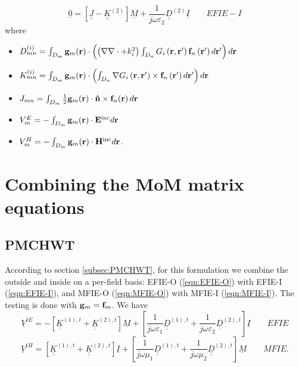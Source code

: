 \begin{equation}\label{eqn:Matrix EFIE-I}
\boxed{\underline{0} =  \left[\underline{\underline{J}} - \underline{\underline{K}}^{(2)} \right] \underline{M} + \frac{1}{j \omega \varepsilon_2}  \underline{\underline{D}}^{(2)} \underline{I} } \qquad EFIE-I 
\end{equation}
where
\begin{itemize}
\item $D_{mn}^{(i)} = \int_{D_m}\mathbf{g}_m \!\left(\mathbf{r}\right) \cdot \left( \left(\nabla \nabla \cdot + k_i^2\right) \int_{D_n} G_i\left(\mathbf{r}, \mathbf{r}'\right) \mathbf{f}_n\left(\mathbf{r}'\right) d\mathbf{r}' \right) d\mathbf{r}$
\item $K_{mn}^{(i)} = \int_{D_m} \mathbf{g}_m \!\left(\mathbf{r}\right) \cdot \left(\int_{D_n} \nabla G_i\left(\mathbf{r}, \mathbf{r}'\right) \times \mathbf{f}_n\left(\mathbf{r}'\right) d\mathbf{r}'\right) d\mathbf{r}$
\item $J_{mn} = \int_{D_m} \frac{1}{2} \mathbf{g}_m \!\left(\mathbf{r}\right) \cdot \mathbf{\hat{n}} \times \mathbf{f}_{n}\!\left(\mathbf{r}\right)d\mathbf{r}$
\item $V_m^{E} = -\int_{D_m}\mathbf{g}_m \!\left(\mathbf{r}\right) \cdot \mathbf{E}^\text{inc} d\mathbf{r}$
\item $V_m^{H} = -\int_{D_m}\mathbf{g}_m \!\left(\mathbf{r}\right) \cdot \mathbf{H}^\text{inc} d\mathbf{r}$.
\end{itemize}

\section{Combining the MoM matrix equations}
%
\par
\subsection{PMCHWT}
%
\par
According to section \ref{subsec:PMCHWT}, for this formulation we combine the outside and inside on a per-field basis: EFIE-O (\ref{eqn:EFIE-O}) with EFIE-I (\ref{eqn:EFIE-I}), and MFIE-O (\ref{eqn:MFIE-O}) with MFIE-I (\ref{eqn:MFIE-I}). The testing is done with $\mathbf{g}_m = \mathbf{f}_m$. We have
\begin{equation}\label{eqn:Matrix EFIE}
\boxed{\underline{V}^{tE} =  -\left[\underline{\underline{K}}^{(1),t} + \underline{\underline{K}}^{(2),t} \right] \underline{M} + \left[\frac{1}{j \omega \varepsilon_1}  \underline{\underline{D}}^{(1),t} + \frac{1}{j \omega \varepsilon_2}  \underline{\underline{D}}^{(2),t}\right] \underline{I} } \qquad EFIE 
\end{equation}
\begin{equation}\label{eqn:Matrix MFIE}
\boxed{\underline{V}^{tH} =  \left[\underline{\underline{K}}^{(1),t} + \underline{\underline{K}}^{(2),t} \right] \underline{I} + \left[\frac{1}{j \omega \mu_1}  \underline{\underline{D}}^{(1),t} + \frac{1}{j \omega \mu_2}  \underline{\underline{D}}^{(2),t}\right] \underline{M} } \qquad MFIE.
\end{equation}



